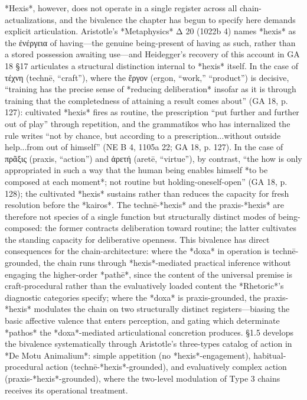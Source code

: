 \documentclass{article}
\newcommand{\gk}[1]{{\greekfont #1}}
\begin{document}
*Hexis*, however, does not operate in a single register across all chain-actualizations, and the bivalence the chapter has begun to specify here demands explicit articulation. Aristotle's *Metaphysics* Δ 20 (1022b 4) names *hexis* as the \gk{ἐνέργεια} of having---the genuine being-present of having as such, rather than a stored possession awaiting use---and Heidegger's recovery of this account in GA 18 §17 articulates a structural distinction internal to *hexis* itself. In the case of \gk{τέχνη} (technē, ``craft''), where the \gk{ἔργον} (ergon, ``work,'' ``product'') is decisive, ``training has the precise sense of *reducing deliberation* insofar as it is through training that the completedness of attaining a result comes about'' (GA 18, p. 127): cultivated *hexis* fires as routine, the prescription ``put further and further out of play'' through repetition, and the grammatikos who has internalized the rule writes ``not by chance, but according to a prescription...without outside help...from out of himself'' (NE B 4, 1105a 22; GA 18, p. 127). In the case of \gk{πρᾶξις} (praxis, ``action'') and \gk{ἀρετή} (aretē, ``virtue''), by contrast, ``the how is only appropriated in such a way that the human being enables himself *to be composed at each moment*; not routine but holding-oneself-open'' (GA 18, p. 128); the cultivated *hexis* sustains rather than reduces the capacity for fresh resolution before the *kairos*. The technē-*hexis* and the praxis-*hexis* are therefore not species of a single function but structurally distinct modes of being-composed: the former contracts deliberation toward routine; the latter cultivates the standing capacity for deliberative openness. This bivalence has direct consequences for the chain-architecture: where the *doxa* in operation is technē-grounded, the chain runs through *hexis*-mediated practical inference without engaging the higher-order *pathē*, since the content of the universal premise is craft-procedural rather than the evaluatively loaded content the *Rhetoric*'s diagnostic categories specify; where the *doxa* is praxis-grounded, the praxis-*hexis* modulates the chain on two structurally distinct registers---biasing the basic affective valence that enters perception, and gating which determinate *pathos* the *doxa*-mediated articulational concretion produces. §1.5 develops the bivalence systematically through Aristotle's three-types catalog of action in *De Motu Animalium*: simple appetition (no *hexis*-engagement), habitual-procedural action (technē-*hexis*-grounded), and evaluatively complex action (praxis-*hexis*-grounded), where the two-level modulation of Type 3 chains receives its operational treatment.
\end{document}

